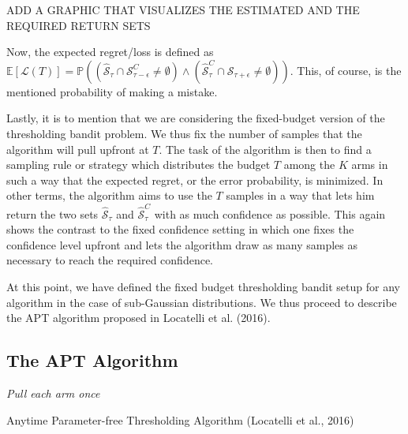 \documentclass[12pt,]{article}
\begin{document}
ADD A GRAPHIC THAT VISUALIZES THE ESTIMATED AND THE REQUIRED RETURN SETS

Now, the expected regret/loss is defined as
\(\mathbb{E}[\mathcal{L}(T)] = \mathbb{P}((\hat{\mathcal{S}}_{\tau} \cap \mathcal{S}_{\tau-\epsilon}^C \neq \emptyset) \land (\hat{\mathcal{S}}_{\tau}^C \cap \mathcal{S}_{\tau+\epsilon} \neq \emptyset))\).
This, of course, is the mentioned probability of making a mistake.

Lastly, it is to mention that we are considering the fixed-budget
version of the thresholding bandit problem. We thus fix the number of
samples that the algorithm will pull upfront at \(T\). The task of the
algorithm is then to find a sampling rule or strategy which distributes
the budget \(T\) among the \(K\) arms in such a way that the expected
regret, or the error probability, is minimized. In other terms, the
algorithm aims to use the \(T\) samples in a way that lets him return
the two sets \(\hat{\mathcal{S}}_{\tau}\) and
\(\hat{\mathcal{S}}_{\tau}^C\) with as much confidence as possible. This
again shows the contrast to the fixed confidence setting in which one
fixes the confidence level upfront and lets the algorithm draw as many
samples as necessary to reach the required confidence.

At this point, we have defined the fixed budget thresholding bandit
setup for any algorithm in the case of sub-Gaussian distributions. We
thus proceed to describe the APT algorithm proposed in Locatelli et al.
(2016).

\subsection{The APT Algorithm}\label{the-apt-algorithm}

\IncMargin{1em}

\begin{algorithm}
\Input{$\tau$, $\epsilon$}
\BlankLine
\emph{Pull each arm once}\;
\caption{Anytime Parameter-free Thresholding Algorithm (Locatelli et al., 2016)}\label{algo_apt}
\end{algorithm}
\end{document}
